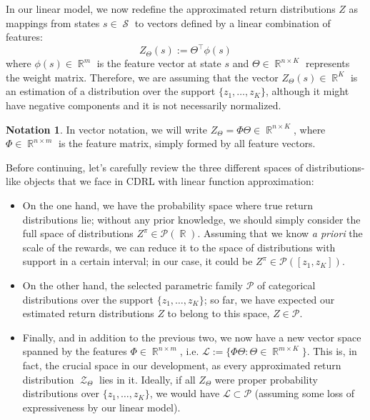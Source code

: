 \documentclass[12pt,a4paper,openright,twoside]{article}
\DeclareMathOperator*{\R}{\mathbb{R}}
\DeclareMathOperator*{\Sspace}{\mathcal{S}}
\DeclareMathOperator*{\Z}{\mathcal{Z}}
\numberwithin{equation}{section}
\theoremstyle{definition}
\newtheorem*{notation}{Notation}
\theoremstyle{remark}
\theoremstyle{plain}
\begin{document}
In our linear model, we now redefine the approximated return distributions $Z$ as mappings from states $s\in \Sspace$ to vectors defined by a linear combination of features:
\begin{equation}
	Z_{\Theta}(s) := \Theta^\top \phi(s)
\end{equation}
where $\phi(s)\in \R^m$ is the feature vector at state $s$ and $\Theta \in \R^{n\times K}$ represents the weight matrix. Therefore, we are assuming that the vector $Z_{\Theta}(s) \in \R^{K}$ is an estimation of a distribution over the support $\{z_1,\dots,z_K\}$, although it might have negative components and it is not necessarily normalized. 

\begin{notation}
	In vector notation, we will write $Z_{\Theta} = \Phi \Theta \in \R^{n\times K}$, where $\Phi \in \R^{n \times m}$ is the feature matrix, simply formed by all feature vectors.
\end{notation}


Before continuing, let's carefully review the three different spaces of distributions-like objects that we face in CDRL with linear function approximation:
\begin{itemize}
	\item On the one hand, we have the probability space where true return distributions lie; without any prior knowledge, we should simply consider the full space of distributions $Z^\pi \in \mathscr{P}(\R)$. Assuming that we know \textit{a priori} the scale of the rewards, we can reduce it to the space of distributions with support in a certain interval; in our case, it could be $Z^\pi \in \mathscr{P}([z_1,z_K])$.
	\item On the other hand, the selected parametric family $\mathcal{P}$ of categorical distributions over the support $\{z_1,\dots,z_K\}$; so far, we have expected our estimated return distributions $Z$ to belong to this space, $Z \in \mathcal{P}$.
	\item Finally, and in addition to the previous two, we now have a new vector space spanned by the features $\Phi \in \R^{n\times m}$, i.e. $\mathcal{L} := \{ \Phi\Theta : \Theta \in \R^{m\times K}\}$. This is, in fact, the crucial space in our development, as every approximated return distribution $\Z_{\Theta}$ lies in it. Ideally, if all $Z_\Theta$ were proper probability distributions over $\{z_1,\dots,z_K\}$, we would have $\mathcal{L} \subset \mathcal{P}$ (assuming some loss of expressiveness by our linear model).
\end{itemize}
\end{document}
